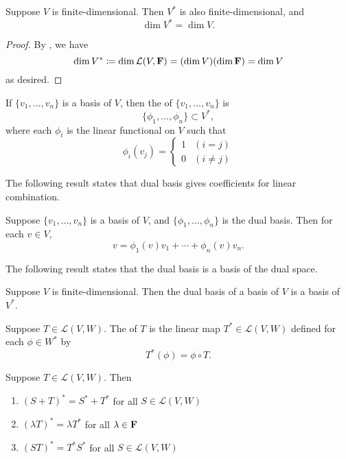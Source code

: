 \begin{lemma}
Suppose $V$ is finite-dimensional. Then $V^*$ is also finite-dimensional, and
\[\dim V^*=\dim V.\]
\end{lemma}

\begin{proof}
By , we have
\[\dim V^*\coloneqq\dim\mathcal{L}(V,\mathbf F)=(\dim V)(\dim\mathbf F)=\dim V\]
as desired.
\end{proof}

\begin{definition}
If $\{v_1,\dots,v_n\}$ is a basis of $V$, then the  of $\{v_1,\dots,v_n\}$ is
\[\{\phi_1,\dots,\phi_n\}\subset V^*,\]
where each $\phi_i$ is the linear functional on $V$ such that
\[\phi_i(v_j)=\begin{cases}
1&(i=j)\\
0&(i\neq j)
\end{cases}\]
\end{definition}

The following result states that dual basis gives coefficients for linear combination.

\begin{proposition}
Suppose $\{v_1,\dots,v_n\}$ is a basis of $V$, and $\{\phi_1,\dots,\phi_n\}$ is the dual basis. Then for each $v\in V$,
\[v=\phi_1(v)v_1+\cdots+\phi_n(v)v_n.\]
\end{proposition}

The following result states that the dual basis is a basis of the dual space.

\begin{proposition}
Suppose $V$ is finite-dimensional. Then the dual basis of a basis of $V$ is a basis of $V^*$.
\end{proposition}

\begin{definition}
Suppose $T\in\mathcal{L}(V,W)$. The  of $T$ is the linear map $T^*\in\mathcal{L}(V,W)$ defined for each $\phi\in W^*$ by
\[T^*(\phi)=\phi\circ T.\]
\end{definition}

\begin{proposition}
Suppose $T\in\mathcal{L}(V,W)$. Then
\begin{enumerate}[label=(\arabic*)]
\item $(S+T)^*=S^*+T^*$ for all $S\in\mathcal{L}(V,W)$
\item $(\lambda T)^*=\lambda T^*$ for all $\lambda\in\mathbf F$
\item $(ST)^*=T^* S^*$ for all $S\in\mathcal{L}(V,W)$
\end{enumerate}
\end{proposition}

